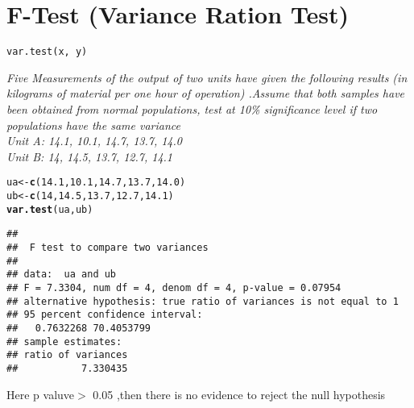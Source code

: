 \documentclass{article}\usepackage[]{graphicx}\usepackage[]{xcolor}
\makeatletter
\newcommand{\hlnum}[1]{\textcolor[rgb]{0.686,0.059,0.569}{#1}}%
\newcommand{\hldef}[1]{\textcolor[rgb]{0.345,0.345,0.345}{#1}}%
\newcommand{\hlkwb}[1]{\textcolor[rgb]{0.69,0.353,0.396}{#1}}%
\newcommand{\hlkwd}[1]{\textcolor[rgb]{0.737,0.353,0.396}{\textbf{#1}}}%
\newenvironment{kframe}{%
 \def\at@end@of@kframe{}%
 \ifinner\ifhmode%
  \def\at@end@of@kframe{\end{minipage}}%
  \begin{minipage}{\columnwidth}%
 \fi\fi%
 \def\FrameCommand##1{\hskip\@totalleftmargin \hskip-\fboxsep
 \colorbox{shadecolor}{##1}\hskip-\fboxsep
     \hskip-\linewidth \hskip-\@totalleftmargin \hskip\columnwidth}%
 \MakeFramed {\advance\hsize-\width
   \@totalleftmargin\z@ \linewidth\hsize
   \@setminipage}}%
 {\par\unskip\endMakeFramed%
 \at@end@of@kframe}
\newenvironment{knitrout}{}{} %
\makeatother
\begin{document}
\section{F-Test (Variance Ration Test)}
\begin{verbatim}
var.test(x, y)  
\end{verbatim}
\emph{Five Measurements of the output of two units have given the following results (in kilograms of material per one hour of operation) .Assume that both samples have been obtained from normal populations, test at 10\% significance level if two populations have the same variance
\\
Unit A: 14.1, 10.1, 14.7, 13.7, 14.0\\
Unit B: 14, 14.5, 13.7, 12.7, 14.1\\}
\begin{knitrout}
\color{fgcolor}\begin{kframe}
\begin{alltt}
\hldef{ua} \hlkwb{<-} \hlkwd{c}\hldef{(}\hlnum{14.1}\hldef{,} \hlnum{10.1}\hldef{,} \hlnum{14.7}\hldef{,} \hlnum{13.7}\hldef{,} \hlnum{14.0}\hldef{)}
\hldef{ub} \hlkwb{<-} \hlkwd{c}\hldef{(}\hlnum{14}\hldef{,} \hlnum{14.5}\hldef{,} \hlnum{13.7}\hldef{,} \hlnum{12.7}\hldef{,} \hlnum{14.1}\hldef{)}
\hlkwd{var.test}\hldef{(ua, ub)}
\end{alltt}
\begin{verbatim}
## 
## 	F test to compare two variances
## 
## data:  ua and ub
## F = 7.3304, num df = 4, denom df = 4, p-value = 0.07954
## alternative hypothesis: true ratio of variances is not equal to 1
## 95 percent confidence interval:
##   0.7632268 70.4053799
## sample estimates:
## ratio of variances 
##           7.330435
\end{verbatim}
\end{kframe}
\end{knitrout}
Here p valuve$ >$ 0.05 ,then there is no evidence to reject the null hypothesis
\newpage
\end{document}
